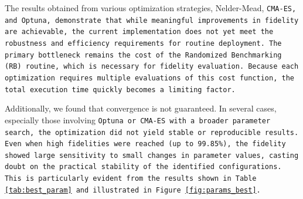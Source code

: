The results obtained from various optimization strategies, Nelder-Mead, \tt{CMA-ES}, and \tt{Optuna}, demonstrate that while meaningful improvements in fidelity are achievable, the current implementation does not yet meet the robustness and efficiency requirements for routine deployment. 
The primary bottleneck remains the cost of the Randomized Benchmarking (RB) routine, which is necessary for fidelity evaluation. 
Because each optimization requires multiple evaluations of this cost function, the total execution time quickly becomes a limiting factor.

Additionally, we found that convergence is not guaranteed. 
In several cases, especially those involving \tt{Optuna} or \tt{CMA-ES} with a broader parameter search, the optimization did not yield stable or reproducible results.
Even when high fidelities were reached (up to 99.85\%), the fidelity showed large sensitivity to small changes in parameter values, casting doubt on the practical stability of the identified configurations.
This is particularly evident from the results shown in Table \ref{tab:best_param} and illustrated in Figure \ref{fig:params_best}.


